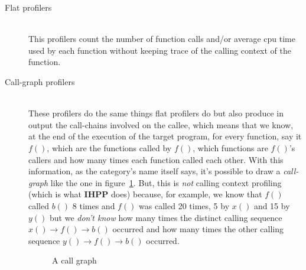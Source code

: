 \documentclass[a4paper,11pt]{report}
\begin{document}
\begin{description}
\item[Flat profilers] \hfill \\
This profilers count the number of function calls and/or average cpu time used
by each function without keeping trace of the calling context of the function.
\item[Call-graph profilers] \hfill \\
These profilers do the same things flat profilers do but also produce in output
the call-chains involved on the callee, which means that we know, at the end of
the execution of the target program, for every function, say it $f()$, which are
the functions called by $f()$, which functions are $f()$'s callers and how many
times each function called each other. With this information, as the category's
name itself says, it's possible to draw a \emph{call-graph} like the one in
figure~\ref{callgraph1}. But, this is \emph{not} calling context profiling (which is what \textbf{IHPP} does) because, for example, we know that $f()$ called $b()$ 8 times and $f()$
was called 20 times, 5 by $x()$ and 15 by $y()$ but we \emph{don't know} how
many times the distinct calling sequence $x()\rightarrow f()\rightarrow b()$
occurred and how many times the other calling sequence $y()\rightarrow
f()\rightarrow b()$ occurred.

\begin{figure}[!]

\begin{center}


\end{center}

\caption{A call graph}
\label{callgraph1}

\end{figure}



\end{description}
\end{document}
